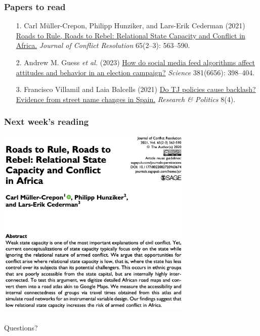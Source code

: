\documentclass[aspectratio=43]{beamer}
\begin{document}
\begin{frame}
\frametitle{Papers to read}
\centering

\begin{itemize}
  \item[1.] Carl Müller-Crepon, Philipp Hunziker, and Lars-Erik Cederman (2021) \href{https://journals.sagepub.com/doi/10.1177/0022002720963674}{Roads to Rule, Roads to Rebel: Relational State Capacity and Conflict in Africa.} \textit{Journal of Conflict Resolution} 65(2--3): 563--590.
  \item[2.] Andrew M. Guess \textit{et al.} (2023) \href{https://www.science.org/doi/10.1126/science.abp9364}{How do social media feed algorithms affect attitudes and behavior in an election campaign?} \textit{Science} 381(6656): 398--404.
  \item[3.] Francisco Villamil and Laia Balcells (2021) \href{https://journals.sagepub.com/doi/full/10.1177/20531680211058550}{Do TJ policies cause backlash? Evidence from street name changes in Spain.} \textit{Research \& Politics} 8(4).
\end{itemize}

\end{frame}

\begin{frame}
\frametitle{Next week's reading}
\centering

\includegraphics[width = 0.7\textwidth]{../img/mullercrepon}

\end{frame}

\begin{frame}
\frametitle{}
\centering

Questions?

\end{frame}


\end{document}
